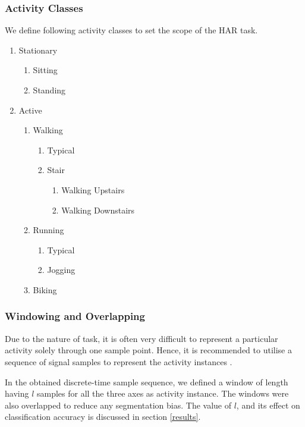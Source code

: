 \documentclass[
10pt,           %
a4paper,        %
oneside,        %
headinclude,footinclude, %
]{scrartcl}
\begin{document}
\subsubsection{Activity Classes}
\label{activity_classes}
We define following activity classes to set the scope of the HAR task.
\begin{enumerate}
	\item Stationary
	\begin{enumerate}
		\item Sitting
		\item Standing
	\end{enumerate}
	\item Active
	\begin{enumerate}
		\item Walking
		\begin{enumerate}
			\item Typical
			\item Stair
			\begin{enumerate}
				\item Walking Upstairs
				\item Walking Downstairs
			\end{enumerate}
		\end{enumerate}
		\item Running
		\begin{enumerate}
			\item Typical
			\item Jogging
		\end{enumerate}
		\item Biking
	\end{enumerate}
\end{enumerate}

\subsubsection{Windowing and Overlapping}
Due to the nature of task, it is often very difficult to represent a particular activity solely through one sample point. Hence, it is recommended to utilise a sequence of signal samples to represent the activity instances \cite{Banos2014}.

In the obtained discrete-time sample sequence, we defined a window of length having $l$ samples for all the three axes as activity instance. The windows were also overlapped to reduce any segmentation bias. The value of $l$, and its effect on classification accuracy is discussed in section \ref{results}.
\end{document}
